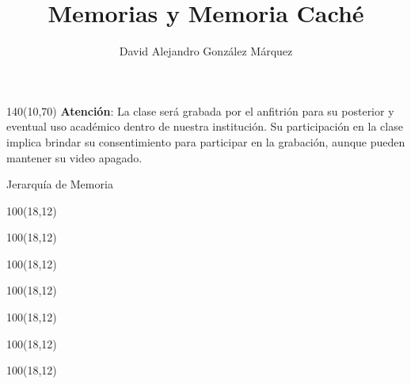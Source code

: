 \documentclass[aspectratio=169]{beamer}
\title{\Huge Memorias y Memoria Caché}
\author{David Alejandro González Márquez}
\date{}
\begin{document}
\begin{frame}[plain]
    \titlepage
    \begin{textblock}{140}(10,70)
    \textcolor{rojo}{
    \textbf{Atención}: La clase será grabada por el anfitrión para su posterior y eventual uso académico dentro de nuestra institución. Su participación en la clase implica brindar su consentimiento para participar en la grabación, aunque pueden mantener su video apagado.}
    \end{textblock}
\end{frame}

\begin{frame}[fragile,t]{Jerarquía de Memoria}
    \begin{textblock}{100}(18,12)  \end{textblock}
    \begin{textblock}{100}(18,12)  \end{textblock}
    \begin{textblock}{100}(18,12)  \end{textblock}
    \begin{textblock}{100}(18,12)  \end{textblock}
    \begin{textblock}{100}(18,12)  \end{textblock}
    \begin{textblock}{100}(18,12)  \end{textblock}
    \begin{textblock}{100}(18,12)  \end{textblock}
    \vspace{6.2cm}
    \begin{center}
    \end{center}
\end{frame}
\end{document}
